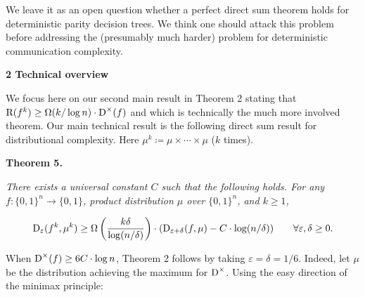 \documentclass[10pt,a4paper]{article}
\begin{document}



We leave it as an open question whether a perfect direct sum theorem holds for deterministic parity decision trees. We think one should attack this problem before addressing the (presumably much harder) problem for deterministic communication complexity.\par






\par\medskip\noindent\textbf{
2 Technical overview}\par




We focus here on our second main result in Theorem 2 stating that ${\textup{R}}(f^{k})\geq\Omega(k/\log n)\cdot{\textup{D}}^{\times}(f)$ and which is technically the much more involved theorem. Our main technical result is the following direct sum result for distributional complexity. Here $\mu^{k}\coloneqq\mu\times\cdots\times\mu$ ($k$ times).\par






\par\medskip\noindent\textbf{
\textbf{Theorem 5}\textbf{.}
}\par



\emph{There exists a universal constant $C$ such that the following holds.
For any $f\colon\{0,1\}^{n}\to\{0,1\}$, product distribution $\mu$ over $\{0,1\}^{n}$, and $k\geq 1$,}\par


\[\begin{gathered}
{\textup{D}}_{\varepsilon}(f^{k},\mu^{k})\geq\Omega\left(\frac{k\delta}{\log(n/\delta)}\right)\cdot({\textup{D}}_{\varepsilon+\delta}(f,\mu)-C\cdot\log(n/\delta))\qquad\forall\varepsilon,\delta\geq 0.
\end{gathered}\]







When ${\textup{D}}^{\times}(f)\geq 6C\cdot\log n$, Theorem 2 follows by taking $\varepsilon=\delta=1/6$. Indeed, let $\mu$ be the distribution achieving the maximum for ${\textup{D}}^{\times}$. Using the easy direction of the minimax principle:\par
\end{document}
